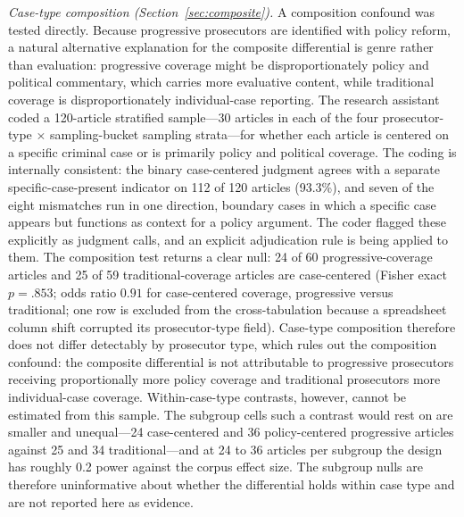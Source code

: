 \documentclass[12pt, letterpaper]{article}
\begin{document}
\emph{Case-type composition (Section~\ref{sec:composite}).} A composition confound was tested directly. Because progressive prosecutors are identified with policy reform, a natural alternative explanation for the composite differential is genre rather than evaluation: progressive coverage might be disproportionately policy and political commentary, which carries more evaluative content, while traditional coverage is disproportionately individual-case reporting. The research assistant coded a 120-article stratified sample---30 articles in each of the four prosecutor-type $\times$ sampling-bucket sampling strata---for whether each article is centered on a specific criminal case or is primarily policy and political coverage. The coding is internally consistent: the binary case-centered judgment agrees with a separate specific-case-present indicator on 112 of 120 articles (93.3\%), and seven of the eight mismatches run in one direction, boundary cases in which a specific case appears but functions as context for a policy argument. The coder flagged these explicitly as judgment calls, and an explicit adjudication rule is being applied to them. The composition test returns a clear null: 24 of 60 progressive-coverage articles and 25 of 59 traditional-coverage articles are case-centered (Fisher exact $p = .853$; odds ratio $0.91$ for case-centered coverage, progressive versus traditional; one row is excluded from the cross-tabulation because a spreadsheet column shift corrupted its prosecutor-type field). Case-type composition therefore does not differ detectably by prosecutor type, which rules out the composition confound: the composite differential is not attributable to progressive prosecutors receiving proportionally more policy coverage and traditional prosecutors more individual-case coverage. Within-case-type contrasts, however, cannot be estimated from this sample. The subgroup cells such a contrast would rest on are smaller and unequal---24 case-centered and 36 policy-centered progressive articles against 25 and 34 traditional---and at 24 to 36 articles per subgroup the design has roughly 0.2 power against the corpus effect size. The subgroup nulls are therefore uninformative about whether the differential holds within case type and are not reported here as evidence.
\end{document}
